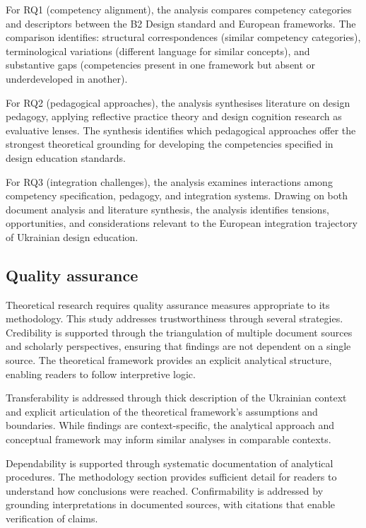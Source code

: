 \documentclass[ed]{acnsart}
\begin{document}
	For RQ1 (competency alignment), the analysis compares competency categories and descriptors between the B2 Design standard and European frameworks. The comparison identifies: structural correspondences (similar competency categories), terminological variations (different language for similar concepts), and substantive gaps (competencies present in one framework but absent or underdeveloped in another).
	
	For RQ2 (pedagogical approaches), the analysis synthesises literature on design pedagogy, applying reflective practice theory and design cognition research as evaluative lenses. The synthesis identifies which pedagogical approaches offer the strongest theoretical grounding for developing the competencies specified in design education standards.
	
	For RQ3 (integration challenges), the analysis examines interactions among competency specification, pedagogy, and integration systems. Drawing on both document analysis and literature synthesis, the analysis identifies tensions, opportunities, and considerations relevant to the European integration trajectory of Ukrainian design education.
	
	\subsection{Quality assurance}
	
	Theoretical research requires quality assurance measures appropriate to its methodology. This study addresses trustworthiness through several strategies. Credibility is supported through the triangulation of multiple document sources and scholarly perspectives, ensuring that findings are not dependent on a single source. The theoretical framework provides an explicit analytical structure, enabling readers to follow interpretive logic.
	
	Transferability is addressed through thick description of the Ukrainian context and explicit articulation of the theoretical framework's assumptions and boundaries. While findings are context-specific, the analytical approach and conceptual framework may inform similar analyses in comparable contexts.
	
	Dependability is supported through systematic documentation of analytical procedures. The methodology section provides sufficient detail for readers to understand how conclusions were reached. Confirmability is addressed by grounding interpretations in documented sources, with citations that enable verification of claims.
	
\end{document}
